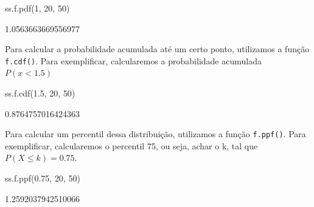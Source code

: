 \documentclass[
  letterpaper,
  DIV=11,
  numbers=noendperiod]{scrreprt}
\newenvironment{Shaded}{\begin{snugshade}}{\end{snugshade}}
\newcommand{\DecValTok}[1]{\textcolor[rgb]{0.68,0.00,0.00}{#1}}
\newcommand{\FloatTok}[1]{\textcolor[rgb]{0.68,0.00,0.00}{#1}}
\newcommand{\NormalTok}[1]{\textcolor[rgb]{0.00,0.23,0.31}{#1}}
\begin{document}
\begin{Shaded}
\begin{Highlighting}[]
\NormalTok{ss.f.pdf(}\DecValTok{1}\NormalTok{, }\DecValTok{20}\NormalTok{, }\DecValTok{50}\NormalTok{)}
\end{Highlighting}
\end{Shaded}

\begin{tcolorbox}[enhanced jigsaw, breakable, leftrule=.75mm, left=2mm, opacityback=0, bottomrule=.15mm, toprule=.15mm, rightrule=.15mm, arc=.35mm, colback=white]

1.0563663669556977

\end{tcolorbox}

Para calcular a probabilidade acumulada até um certo ponto, utilizamos a
função \texttt{f.cdf()}. Para exemplificar, calcularemos a probabilidade
acumulada \(P(x < 1.5)\)

\begin{Shaded}
\begin{Highlighting}[]
\NormalTok{ss.f.cdf(}\FloatTok{1.5}\NormalTok{, }\DecValTok{20}\NormalTok{, }\DecValTok{50}\NormalTok{)}
\end{Highlighting}
\end{Shaded}

\begin{tcolorbox}[enhanced jigsaw, breakable, leftrule=.75mm, left=2mm, opacityback=0, bottomrule=.15mm, toprule=.15mm, rightrule=.15mm, arc=.35mm, colback=white]

0.8764757016424363

\end{tcolorbox}

Para calcular um percentil dessa distribuição, utilizamos a função
\texttt{f.ppf()}. Para exemplificar, calcularemos o percentil 75, ou
seja, achar o k, tal que \(P(X ≤ k) = 0.75\).

\begin{Shaded}
\begin{Highlighting}[]
\NormalTok{ss.f.ppf(}\FloatTok{0.75}\NormalTok{, }\DecValTok{20}\NormalTok{, }\DecValTok{50}\NormalTok{)}
\end{Highlighting}
\end{Shaded}

\begin{tcolorbox}[enhanced jigsaw, breakable, leftrule=.75mm, left=2mm, opacityback=0, bottomrule=.15mm, toprule=.15mm, rightrule=.15mm, arc=.35mm, colback=white]

1.2592037942510066

\end{tcolorbox}
\end{document}
